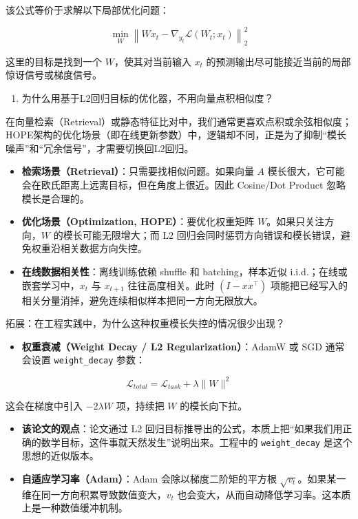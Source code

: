 该公式等价于求解以下局部优化问题：

\[
\min_W
\left\|
W x_t - \nabla_{y_t}\mathcal{L}(W_t;x_t)
\right\|_2^2
\]

这里的目标是找到一个 \(W\)，使其对当前输入 \(x_t\) 的预测输出尽可能接近当前的局部惊讶信号或梯度信号。

\begin{enumerate}
\def\labelenumi{\arabic{enumi}.}
\tightlist
\item
  为什么用基于L2回归目标的优化器，不用向量点积相似度？
\end{enumerate}

在向量检索（Retrieval）或静态特征比对中，我们通常更喜欢点积或余弦相似度；HOPE架构的优化场景（即在线更新参数）中，逻辑却不同，正是为了抑制``模长噪声''和``冗余信号''，才需要切换回L2回归。

\begin{itemize}
\tightlist
\item
  \textbf{检索场景（Retrieval）}：只需要找相似问题。如果向量 \(A\) 模长很大，它可能会在欧氏距离上远离目标，但在角度上很近。因此 Cosine/Dot Product 忽略模长是合理的。
\item
  \textbf{优化场景（Optimization, HOPE）}：要优化权重矩阵 \(W\)。如果只关注方向，\(W\) 的模长可能无限增大；而 L2 回归会同时惩罚方向错误和模长错误，避免权重沿相关数据方向失控。
\item
  \textbf{在线数据相关性}：离线训练依赖 shuffle 和 batching，样本近似 i.i.d.；在线或嵌套学习中，\(x_t\) 与 \(x_{t+1}\) 往往高度相关。此时 \((I-xx^\top)\) 项能把已经写入的相关分量消掉，避免连续相似样本把同一方向无限放大。
\end{itemize}

拓展：在工程实践中，为什么这种权重模长失控的情况很少出现？

\begin{itemize}
\tightlist
\item
  \textbf{权重衰减（Weight Decay / L2 Regularization）}：AdamW 或 SGD 通常会设置 \texttt{weight\_decay} 参数：
\end{itemize}

\[
\mathcal{L}_{total}
=
\mathcal{L}_{task}
+ \lambda\|W\|^2
\]

这会在梯度中引入 \(-2\lambda W\) 项，持续把 \(W\) 的模长向下拉。

\begin{itemize}
\tightlist
\item
  \textbf{该论文的观点}：论文通过 L2 回归目标推导出的公式，本质上把``如果我们用正确的数学目标，这件事就天然发生''说明出来。工程中的 \texttt{weight\_decay} 是这个思想的近似版本。
\item
  \textbf{自适应学习率（Adam）}：Adam 会除以梯度二阶矩的平方根 \(\sqrt{v_t}\)。如果某一维在同一方向积累导致数值变大，\(v_t\) 也会变大，从而自动降低学习率。这本质上是一种数值缓冲机制。
\end{itemize}

